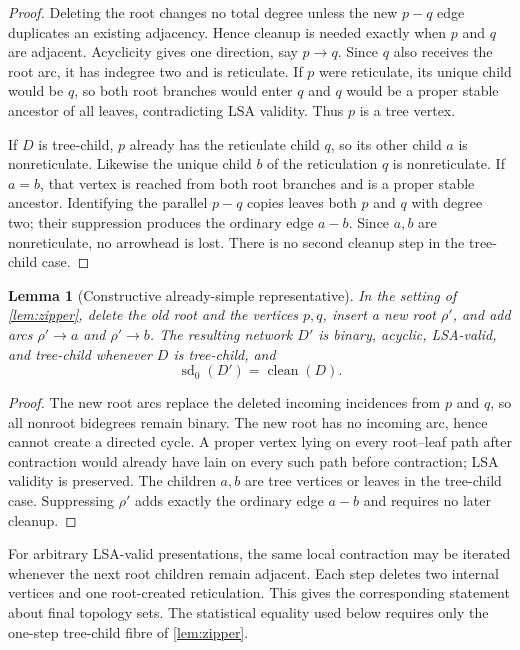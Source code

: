 \documentclass[11pt]{article}
\newtheorem{lemma}[theorem]{Lemma}
\theoremstyle{remark}\newtheorem{remark}[theorem]{Remark}
\begin{document}
\begin{proof}
Deleting the root changes no total degree unless the new $p-q$ edge duplicates an existing adjacency.  Hence cleanup is needed exactly when $p$ and $q$ are adjacent.  Acyclicity gives one direction, say $p\to q$.  Since $q$ also receives the root arc, it has indegree two and is reticulate.  If $p$ were reticulate, its unique child would be $q$, so both root branches would enter $q$ and $q$ would be a proper stable ancestor of all leaves, contradicting LSA validity.  Thus $p$ is a tree vertex.

If $D$ is tree-child, $p$ already has the reticulate child $q$, so its other child $a$ is nonreticulate.  Likewise the unique child $b$ of the reticulation $q$ is nonreticulate.  If $a=b$, that vertex is reached from both root branches and is a proper stable ancestor.  Identifying the parallel $p-q$ copies leaves both $p$ and $q$ with degree two; their suppression produces the ordinary edge $a-b$.  Since $a,b$ are nonreticulate, no arrowhead is lost.  There is no second cleanup step in the tree-child case.
\end{proof}

\begin{lemma}[Constructive already-simple representative]\label{lem:construct}
In the setting of \cref{lem:zipper}, delete the old root and the vertices $p,q$, insert a new root $\rho'$, and add arcs $\rho'\to a$ and $\rho'\to b$.  The resulting network $D'$ is binary, acyclic, LSA-valid, and tree-child whenever $D$ is tree-child, and
\[
\operatorname{sd}_0(D')=\operatorname{clean}(D).
\]
\end{lemma}

\begin{proof}
The new root arcs replace the deleted incoming incidences from $p$ and $q$, so all nonroot bidegrees remain binary.  The new root has no incoming arc, hence cannot create a directed cycle.  A proper vertex lying on every root--leaf path after contraction would already have lain on every such path before contraction; LSA validity is preserved.  The children $a,b$ are tree vertices or leaves in the tree-child case.  Suppressing $\rho'$ adds exactly the ordinary edge $a-b$ and requires no later cleanup.
\end{proof}

For arbitrary LSA-valid presentations, the same local contraction may be iterated whenever the next root children remain adjacent.  Each step deletes two internal vertices and one root-created reticulation.  This gives the corresponding statement about final topology sets.  The statistical equality used below requires only the one-step tree-child fibre of \cref{lem:zipper}.
\end{document}
